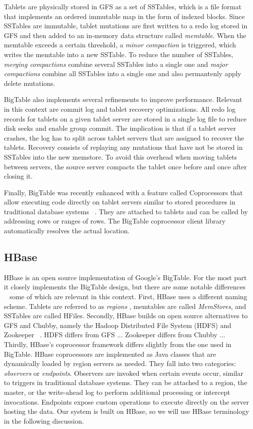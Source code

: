 \documentclass[10pt,final,journal]{IEEEtran}
\begin{document}
Tablets are physically stored in GFS as a set of SSTables, which is a file format that implements an ordered immutable map in the form of indexed blocks. Since SSTables are immutable, tablet mutations are first written to a redo log stored in GFS and then added to an in-memory data structure called \emph{memtable}. When the memtable exceeds a certain threshold, a \emph{minor compaction} is triggered, which writes the memtable into a new SSTable. To reduce the number of SSTables, \emph{merging compactions} combine several SSTables into a single one and \emph{major compactions} combine all SSTables into a single one and also permantenly apply delete mutations.

BigTable also implements several refinements to improve performance. Relevant in this context are commit log and tablet recovery optimizations. All redo log records for tablets on a given tablet server are stored in a single log file to reduce disk seeks and enable group commit. The implication is that if a tablet server crashes, the log has to split across tablet servers that are assigned to recover the tablets. Recovery consists of replaying any mutations that have not be stored in SSTables into the new memstore. To avoid this overhead when moving tablets between servers, the source server compacts the tablet once before and once after closing it.

Finally, BigTable was recently enhanced with a feature called Coprocessors that allow executing code directly on tablet servers similar to stored procedures in traditional database systems ~\cite{Dean:2009}. They are attached to tablets and can be called by addressing rows or ranges of rows. The BigTable coprocessor client library automatically resolves the actual location.

\subsection{HBase}
HBase is an open source implementation of Google's BigTable. For the most part it closely implements the BigTable design, but there are some notable differences ~\cite{George:2011} some of which are relevant in this context. First, HBase uses a different naming scheme. Tablets are referred to as \emph{regions }, memtables are called \emph{MemStores}, and SSTables are called HFiles. Secondly, HBase builds on open source alternatives to GFS and Chubby, namely the Hadoop Distributed File System (HDFS) and Zookeeper ~\cite{Hunt:2010:ZWC:1855840.1855851}. HDFS differs from GFS ... Zookeeper differs from Chubby ...
Thirdly, HBase's coprocessor framework differs slightly from the one used in BigTable. HBase coprocessors are implemented as Java classes that are dynamically loaded by region servers as needed. They fall into two categories: \emph{observers} or \emph{endpoints}. Observers are invoked when certain events occur, similar to triggers in traditional database systems. They can be attached to a region, the master, or the write-ahead log to perform additional processing or intercept invocations. Endpoints expose custom operations to execute directly on the server hosting the data.
Our system is built on HBase, so we will use HBase terminology in the following discussion.
\end{document}
